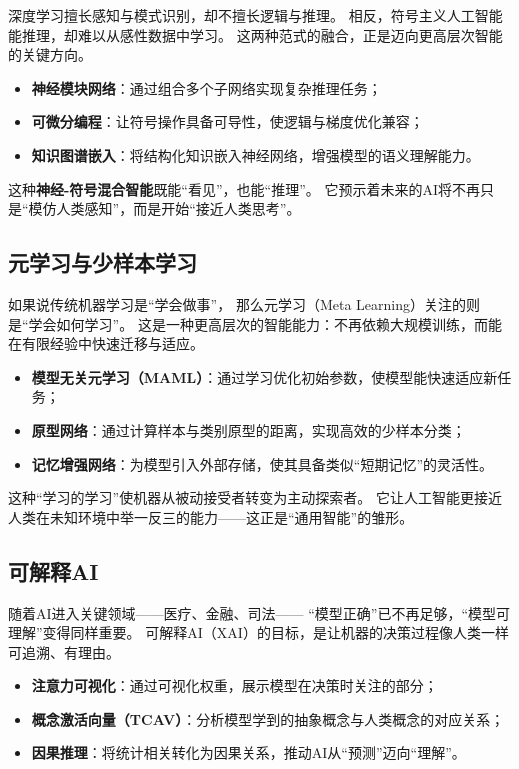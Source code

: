深度学习擅长感知与模式识别，却不擅长逻辑与推理。  
相反，符号主义人工智能能推理，却难以从感性数据中学习。  
这两种范式的融合，正是迈向更高层次智能的关键方向。

\begin{itemize}
\item \textbf{神经模块网络}：通过组合多个子网络实现复杂推理任务；
\item \textbf{可微分编程}：让符号操作具备可导性，使逻辑与梯度优化兼容；
\item \textbf{知识图谱嵌入}：将结构化知识嵌入神经网络，增强模型的语义理解能力。
\end{itemize}

这种\textbf{神经-符号混合智能}既能“看见”，也能“推理”。  
它预示着未来的AI将不再只是“模仿人类感知”，而是开始“接近人类思考”。

\subsection{元学习与少样本学习}

如果说传统机器学习是“学会做事”，  
那么元学习（Meta Learning）关注的则是“学会如何学习”。  
这是一种更高层次的智能能力：不再依赖大规模训练，而能在有限经验中快速迁移与适应。

\begin{itemize}
\item \textbf{模型无关元学习（MAML）}：通过学习优化初始参数，使模型能快速适应新任务；
\item \textbf{原型网络}：通过计算样本与类别原型的距离，实现高效的少样本分类；
\item \textbf{记忆增强网络}：为模型引入外部存储，使其具备类似“短期记忆”的灵活性。
\end{itemize}

这种“学习的学习”使机器从被动接受者转变为主动探索者。  
它让人工智能更接近人类在未知环境中举一反三的能力——这正是“通用智能”的雏形。

\subsection{可解释AI}

随着AI进入关键领域——医疗、金融、司法——  
“模型正确”已不再足够，“模型可理解”变得同样重要。  
可解释AI（XAI）的目标，是让机器的决策过程像人类一样可追溯、有理由。

\begin{itemize}
\item \textbf{注意力可视化}：通过可视化权重，展示模型在决策时关注的部分；
\item \textbf{概念激活向量（TCAV）}：分析模型学到的抽象概念与人类概念的对应关系；
\item \textbf{因果推理}：将统计相关转化为因果关系，推动AI从“预测”迈向“理解”。
\end{itemize}


